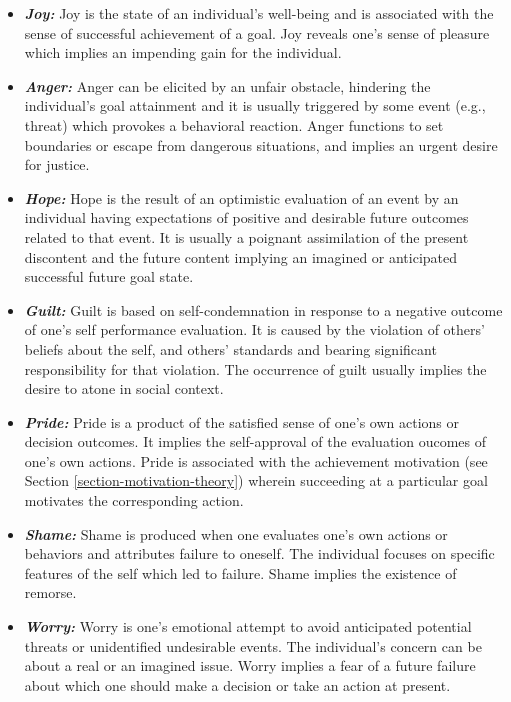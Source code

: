 \documentclass[12pt]{report}
\begin{document}
\begin{itemize}
  \item \textbf{\textit{Joy:}} Joy is the state of an individual's well-being
  and is associated with the sense of successful achievement of a goal. Joy
  reveals one's sense of pleasure which implies an impending gain for the
  individual.
  
  \item \textbf{\textit{Anger:}} Anger can be elicited by an unfair obstacle,
  hindering the individual's goal attainment and it is usually triggered by some
  event (e.g., threat) which provokes a behavioral reaction. Anger functions to
  set boundaries or escape from dangerous situations, and implies an urgent
  desire for justice.
  
  \item \textbf{\textit{Hope:}} Hope is the result of an optimistic evaluation
  of an event by an individual having expectations of positive and desirable
  future outcomes related to that event. It is usually a poignant assimilation
  of the present discontent and the future content implying an imagined or
  anticipated successful future goal state.
  
  \item \textbf{\textit{Guilt:}} Guilt is based on self-condemnation in response
  to a negative outcome of one's self performance evaluation. It is caused by
  the violation of others' beliefs about the self, and others' standards and
  bearing significant responsibility for that violation. The occurrence of
  guilt usually implies the desire to atone in social context.
  
  \item \textbf{\textit{Pride:}} Pride is a product of the satisfied sense of
  one's own actions or decision outcomes. It implies the self-approval of the
  evaluation oucomes of one's own actions. Pride is associated with the
  achievement motivation (see Section \ref{section-motivation-theory}) wherein
  succeeding at a particular goal motivates the corresponding action.
  
  \item \textbf{\textit{Shame:}} Shame is produced when one evaluates one's own
  actions or behaviors and attributes failure to oneself. The individual focuses
  on specific features of the self which led to failure. Shame implies the
  existence of remorse.
  
  \item \textbf{\textit{Worry:}} Worry is one's emotional attempt to avoid
  anticipated potential threats or unidentified undesirable events. The
  individual's concern can be about a real or an imagined issue. Worry implies a
  fear of a future failure about which one should make a decision or take an
  action at present.
\end{itemize}
\end{document}
